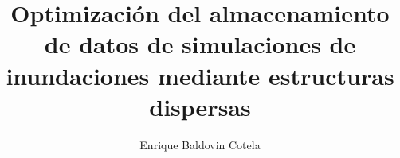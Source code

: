 \documentclass[a4paper,12pt,oneside,hidelinks]{report}
\begin{document}
\title{Optimización del almacenamiento de datos de simulaciones de inundaciones mediante estructuras dispersas}
\author{Enrique Baldovin Cotela}

\baselineskip 19pt
\renewcommand{\labelitemi}{$-$}
\renewcommand{\tablename}{Tabla}
\renewcommand{\bibname}{Bibliografía}
\renewcommand{\appendixname}{Anexo}
\renewcommand{\appendixtocname}{Anexos}
\renewcommand{\appendixpagename}{Anexos}



\clearpage

\clearpage

\clearpage

\renewcommand{\contentsname}{Índice}
\tableofcontents
\clearpage

\clearpage










\clearpage
{}



\newpage
\renewcommand\listfigurename{Lista de Figuras}
\listoffigures

\newpage
\renewcommand\listtablename{Lista de Tablas}
\listoftables


\clearpage
\appendix
\addappheadtotoc
\appendixpage










\end{document}
